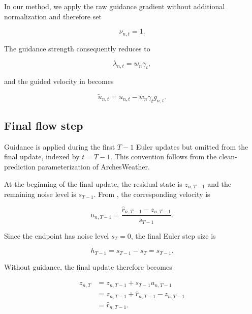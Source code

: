 In our method, we apply the raw guidance gradient without additional
normalization and therefore set

\begin{equation}
    \nu_{n,t}
    =
    1.
\end{equation}

The guidance strength consequently reduces to

\begin{equation}
    \lambda_{n,t}
    =
    w_n\gamma_t,
    \label{eq:scalar-gain-guidance-strength}
\end{equation}

and the guided velocity in
 becomes

\begin{equation}
    \tilde{u}_{n,t}
    =
    u_{n,t}
    -
    w_n\gamma_t g_{n,t}.
    \label{eq:scalar-gain-guided-velocity}
\end{equation}


\subsection{Final flow step}

Guidance is applied during the first $T-1$ Euler updates but omitted from the
final update, indexed by $t=T-1$. This convention follows from the
clean-prediction parameterization of ArchesWeather.

At the beginning of the final update, the residual state is $z_{n,T-1}$ and
the remaining noise level is $s_{T-1}$. From
, the corresponding velocity is

\begin{equation}
    u_{n,T-1}
    =
    \frac{
        \hat{r}_{n,T-1}
        -
        z_{n,T-1}
    }{
        s_{T-1}
    }.
    \label{eq:final-flow-velocity}
\end{equation}

Since the endpoint has noise level $s_T=0$, the final Euler step size is

\begin{equation}
    h_{T-1}
    =
    s_{T-1}-s_T
    =
    s_{T-1}.
\end{equation}

Without guidance, the final update therefore becomes

\begin{align}
    z_{n,T}
    &=
    z_{n,T-1}
    +
    s_{T-1}u_{n,T-1}
    \\
    &=
    z_{n,T-1}
    +
    \hat{r}_{n,T-1}
    -
    z_{n,T-1}
    \\
    &=
    \hat{r}_{n,T-1}.
    \label{eq:final-flow-snap}
\end{align}

